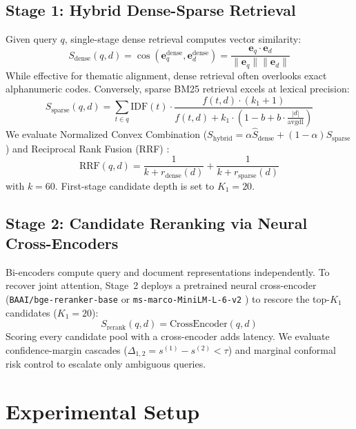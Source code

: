 \subsection{Stage 1: Hybrid Dense-Sparse Retrieval}
Given query $q$, single-stage dense retrieval computes vector similarity:
\begin{equation}
    S_{\text{dense}}(q, d) = \cos(\mathbf{e}_q^{\text{dense}}, \mathbf{e}_d^{\text{dense}}) = \frac{\mathbf{e}_q \cdot \mathbf{e}_d}{\|\mathbf{e}_q\| \|\mathbf{e}_d\|}
\end{equation}
While effective for thematic alignment, dense retrieval often overlooks exact alphanumeric codes. Conversely, sparse BM25 retrieval excels at lexical precision:
\begin{equation}
    S_{\text{sparse}}(q, d) = \sum_{t \in q} \text{IDF}(t) \cdot \frac{f(t, d) \cdot (k_1 + 1)}{f(t, d) + k_1 \cdot \left(1 - b + b \cdot \frac{|d|}{\text{avgdl}}\right)}
\end{equation}
We evaluate Normalized Convex Combination ($S_{\text{hybrid}} = \alpha \hat{S}_{\text{dense}} + (1-\alpha) \hat{S}_{\text{sparse}}$) and Reciprocal Rank Fusion (RRF) \cite{cormack2009rrf}:
\begin{equation}
    \text{RRF}(q, d) = \frac{1}{k + r_{\text{dense}}(d)} + \frac{1}{k + r_{\text{sparse}}(d)}
    \label{eq:rrf}
\end{equation}
with $k=60$. First-stage candidate depth is set to $K_1 = 20$.

\subsection{Stage 2: Candidate Reranking via Neural Cross-Encoders}
Bi-encoders compute query and document representations independently. To recover joint attention, Stage~2 deploys a pretrained neural cross-encoder (\texttt{BAAI/bge-reranker-base} \cite{xiao2023bge} or \texttt{ms-marco-MiniLM-L-6-v2} \cite{nogueira2019passage, reimers2019sbert}) to rescore the top-$K_1$ candidates ($K_1 = 20$):
\begin{equation}
    S_{\text{rerank}}(q, d) = \text{CrossEncoder}(q, d)
\end{equation}
Scoring every candidate pool with a cross-encoder adds latency. We evaluate confidence-margin cascades ($\Delta_{1,2} = s^{(1)} - s^{(2)} < \tau$) and marginal conformal risk control to escalate only ambiguous queries.

\section{Experimental Setup}
\label{sec:experimental_setup}


